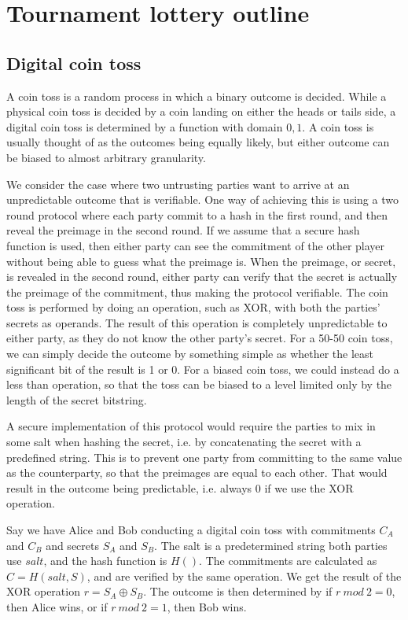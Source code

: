 \section{Tournament lottery outline}
\label{sec:outline}
\subsection{Digital coin toss}
A coin toss is a random process in which a binary outcome is decided. While a physical coin toss is decided by a coin landing on either the heads or tails side, a digital coin toss is determined by a function with domain ${0, 1}$. A coin toss is usually thought of as the outcomes being equally likely, but either outcome can be biased to almost arbitrary granularity.

We consider the case where two untrusting parties want to arrive at an unpredictable outcome that is verifiable. One way of achieving this is using a two round protocol where each party commit to a hash in the first round, and then reveal the preimage in the second round. If we assume that a secure hash function is used, then either party can see the commitment of the other player without being able to guess what the preimage is. When the preimage, or secret, is revealed in the second round, either party can verify that the secret is actually the preimage of the commitment, thus making the protocol verifiable. The coin toss is performed by doing an operation, such as XOR, with both the parties' secrets as operands. The result of this operation is completely unpredictable to either party, as they do not know the other party's secret. For a 50-50 coin toss, we can simply decide the outcome by something simple as whether the least significant bit of the result is 1 or 0. For a biased coin toss, we could instead do a less than operation, so that the toss can be biased to a level limited only by the length of the secret bitstring.

A secure implementation of this protocol would require the parties to mix in some salt when hashing the secret, i.e. by concatenating the secret with a predefined string. This is to prevent one party from committing to the same value as the counterparty, so that the preimages are equal to each other. That would result in the outcome being predictable, i.e. always 0 if we use the XOR operation. 

Say we have Alice and Bob conducting a digital coin toss with commitments $C_A$ and $C_B$ and secrets $S_A$ and $S_B$. The salt is a predetermined string both parties use $salt$, and the hash function is $H()$. The commitments are calculated as $C=H(salt, S)$, and are verified by the same operation. We get the result of the XOR operation $r=S_A \oplus S_B$. The outcome is then determined by if $r\ mod\ 2 = 0$, then Alice wins, or if $r\ mod\ 2 = 1$, then Bob wins.

